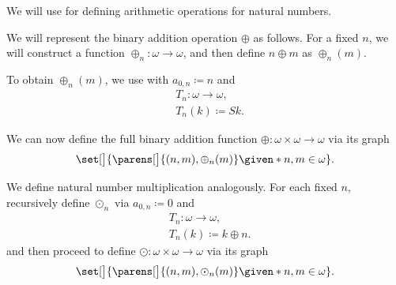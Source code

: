 \begin{definition}\label{def:omega_operations}\mimprovised
  We will use  for defining arithmetic operations for natural numbers.

  \begin{thmenum}
     We will represent the binary addition operation \( \oplus \) as follows. For a fixed \( n \), we will construct a function \( \oplus_n: \omega \to \omega \), and then define \( n \oplus m \) as \( \oplus_n(m) \).

    To obtain \( \oplus_n(m) \), we use  with \( a_{0,n} \coloneqq n \) and
    \begin{equation*}
      \begin{aligned}
        &T_n: \omega \to \omega, \\
        &T_n(k) \coloneqq Sk.
      \end{aligned}
    \end{equation*}

    We can now define the full binary addition function \( \oplus: \omega \times \omega \to \omega \) via its graph
    \begin{equation*}
      \set[\big]{ \parens[\big]{ (n, m), \oplus_n(m) } \given* n, m \in \omega }.
    \end{equation*}

     We define natural number multiplication analogously. For each fixed \( n \), recursively define \( \odot_n \) via \( a_{0,n} \coloneqq 0 \) and
    \begin{equation*}
      \begin{aligned}
        &T_n: \omega \to \omega, \\
        &T_n(k) \coloneqq k \oplus n.
      \end{aligned}
    \end{equation*}
    and then proceed to define \( \odot: \omega \times \omega \to \omega \) via its graph
    \begin{equation*}
      \set[\big]{ \parens[\big]{ (n, m), \odot_n(m) } \given* n, m \in \omega }.
    \end{equation*}
  \end{thmenum}
\end{definition}

